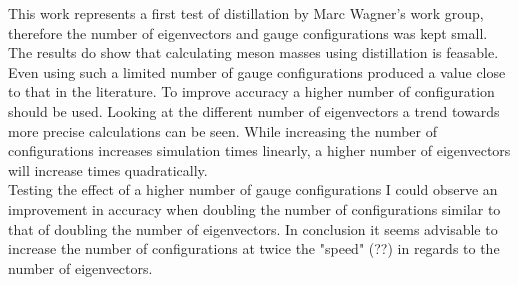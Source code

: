 This work represents a first test of distillation by Marc Wagner's work group, therefore the number of eigenvectors and gauge configurations was kept small.\\
The results do show that calculating meson masses using distillation is feasable. Even using such a limited number of gauge configurations produced a value close to that in the literature. To improve accuracy a higher number of configuration should be used. Looking at the different number of eigenvectors a trend towards more precise calculations can be seen. While increasing the number of configurations increases simulation times linearly, a higher number of eigenvectors will increase times quadratically.\\
Testing the effect of a higher number of gauge configurations I could observe an improvement in accuracy when doubling the number of configurations similar to that of doubling the number of eigenvectors. In conclusion it seems advisable to increase the number of configurations at twice the "speed" (??) in regards to the number of eigenvectors.